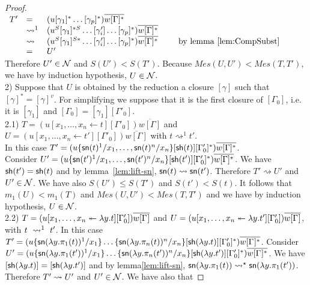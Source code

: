 \documentclass{llncs} %
\begin{document}
\begin{proof}
$
\begin{array}{llll}
 T' & = & (u[\gamma_1]^* \dots[\gamma_p]^*)\overline{w[\Gamma]^*} & \\
    & \rightsquigarrow^1 & (u^S[\gamma_1]^{*S} \dots [\gamma'_i]\dots [\gamma_p]^*)\overline{w[\Gamma]^*} & \\
    & \rightsquigarrow & (u^S[\gamma_1]^{S*} \dots [\gamma'_i]\dots [\gamma_p]^*)\overline{w[\Gamma]^*} & \hspace{0.5cm} \mbox{by lemma~\ref{lem:CompSubst}  }\\
    & = & U' &
\end{array}
$
\\
Therefore $U'\in\mathcal{N}$ and $S(U')<S(T')$. Because $Mes(U,U') < Mes(T,T')$, we have by induction hypothesis, $U\in\mathcal{N}$.
%
%
\medskip
\\
2) Suppose that $U$ is obtained by the reduction a closure $[\gamma]$ such that  $[\gamma]^* = [\gamma]^v$. For simplifying we suppose that it is the first closure of $[\Gamma_0]$, i.e. it is $[\gamma_1]$ and $[\Gamma_0] = [\gamma_1][\Gamma'_0]$.
\smallskip
\\
2.1)  $T = (u[x_1,\dots,x_n \leftarrow t][\Gamma'_0])\overline{w[\Gamma]}$ and $U = (u[x_1,\dots,x_n \leftarrow t'][\Gamma'_0])\overline{w[\Gamma]}$ with $t\rightsquigarrow^1 t'$.
\\
In this case $T' = (u\{{\mathsf{sn}}(t)^1/x_1,\dots,{\mathsf{sn}}(t)^n/x_n\}[{\mathsf{sh}} (t)][\Gamma'_0]^*)\overline{w[\Gamma]^*}$.
\\
Consider $U' = (u\{{\mathsf{sn}}(t')^1/x_1,\dots,{\mathsf{sn}}(t')^n/x_n\}[{\mathsf{sh}} (t')][\Gamma'_0]^*)\overline{w[\Gamma]^*}$. We have ${\mathsf{sh}} (t') = {\mathsf{sh}} (t)$ and by lemma~\ref{lem:lift-sn}, ${\mathsf{sn}} (t) \rightsquigarrow {\mathsf{sn}} (t')$. Therefore $T'\rightsquigarrow U'$ and $U'\in\mathcal{N}$. We have also $S(U')\leq S(T')$ and $S(t')<S(t)$. It follows that  $m_1(U) < m_1(T)$ and  $Mes(U,U') < Mes(T,T')$ and we have by induction hypothesis, $U\in\mathcal{N}$.
%
\smallskip
\\
2.2)
$T =  (u\distr xyt[\Gamma_0'])\overline{w\G}$ and
$U =  (u\distr xy{t'}[\Gamma_0'])\overline{w\G}$, with $t ~\rewrite^1~ t'$.
In this case
$T' = (u\sub{x_1}{\sn(\lambda y.\pi_1(t))^1}\dots\sub{x_n}{\sn(\lambda
y.\pi_n(t))^n}[\sh(\lambda y.t)][\Gamma_0']^*)\overline{w\G^*}$.
Consider
$U' = (u\sub{x_1}{\sn(\lambda
y.\pi_1(t'))^1}\dots\sub{x_n}{\sn(\lambda y.\pi_n(t'))^n}[\sh(\lambda
y.t')][\Gamma_0']^*)\overline{w\G^*}$.
We have $[{\mathsf{sh}}(\lambda y.t)]=[{\mathsf{sh}}(\lambda y.t')]$ and by lemma\ref{lem:lift-sn},
$\sn(\lambda y.\pi_1(t)) \rewrite^\star \sn(\lambda y.\pi_1(t'))$.
Therefore $T'\rewrite U'$ and $U'\in\mathcal{N}$. We have also that

\end{proof}
\end{document}

